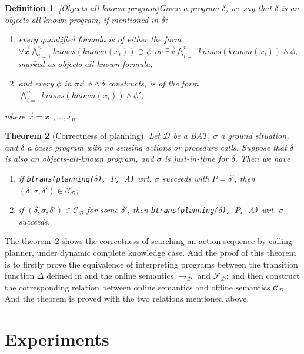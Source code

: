 \documentclass[letterpaper]{article}
\newtheorem{theorem}{Theorem}[section]
\newtheorem{DEFINITION}[theorem]{Definition}
\newenvironment{definition}{\begin{DEFINITION} \rm }
                            {\end{DEFINITION}}
\begin{document}
\begin{definition}[Objects-all-known program]\label{objects all known program}
Given a program $\delta$, we say that $\delta$ is an \emph{objects-all-known program}, if mentioned in $\delta$:
\begin{enumerate}
  \item every quantified formula is of either the form $\forall\vec{x}\bigwedge_{i=1}^n knows(known(x_i))\supset \phi$ or $\exists\vec{x}\bigwedge_{i=1}^n knows(known(x_i))\wedge \phi$, marked as \emph{objects-all-known formula},
  \item and every $\phi$ in $\pi\vec{x}.\phi\wedge\delta$ constructs, is of the form $\bigwedge_{i=1}^n knows(known(x_i))\wedge \phi'$,
\end{enumerate}
where $\vec{x}=x_1,\ldots,x_n$.
\end{definition}

\begin{theorem}[Correctness of planning]\label{planning theorem}
Let $\mathcal{D}$ be a BAT, $\sigma$ a ground situation, and $\delta$ a basic program with no sensing actions or procedure calls. Suppose that $\delta$ is also an objects-all-known program, and $\sigma$ is just-in-time for $\delta$. Then we have
\begin{enumerate}
  \item if \texttt{btrans(planning($\delta$), $P$, $A$)} wrt. $\sigma$ succeeds with $P=\delta'$, then $(\delta, \sigma, \delta') \in \mathcal{C_D}$;
  \item if $(\delta, \sigma, \delta') \in \mathcal{C_D}$ for some $\delta'$, then \texttt{btrans(planning($\delta$), $P$, $A$)} wrt. $\sigma$ succeeds.
\end{enumerate}
\end{theorem}

The theorem~\ref{planning theorem} shows the correctness of searching an action sequence by calling planner, under dynamic complete knowledge case. And the proof of this theorem is to firstly prove the equivalence of interpreting programs between the transition function $\Delta$ defined in \cite{BFM07} and the online semantics $\rightarrow_\mathcal{D}$ and $\mathcal{F_D}$; and then construct the corresponding relation between online semantics and offline semantics $\mathcal{C_D}$. And the theorem is proved with the two relations mentioned above.

\section{Experiments}
\end{document}
